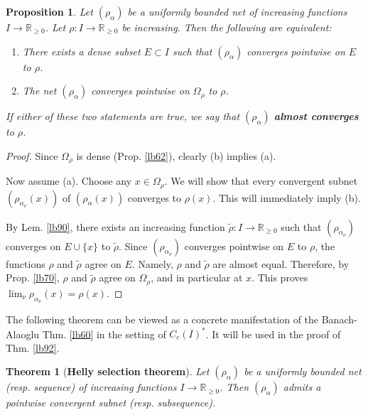 \documentclass[12pt,b5paper,notitlepage]{article}
\theoremstyle{definition}
\theoremstyle{plain}
\newtheorem{thm}[df]{Theorem}
\newtheorem{pp}[df]{Proposition}
\newcommand{\wtd}{\widetilde}
\newcommand{\Rbb}{\mathbb R}
\numberwithin{equation}{section}
\begin{document}
\begin{pp}\label{lb91}
Let $(\rho_\alpha)$ be a uniformly bounded net of increasing functions $I\rightarrow\Rbb_{\geq0}$. Let $\rho:I\rightarrow\Rbb_{\geq0}$ be increasing. Then the following are equivalent:
\begin{enumerate}[label=(\alph*)]
\item There exists a dense subset $E\subset I$ such that $(\rho_\alpha)$ converges pointwise on $E$ to $\rho$.
\item The net $(\rho_\alpha)$ converges pointwise on $\Omega_\rho$ to $\rho$.
\end{enumerate}
If either of these two statements are true, we say that $(\rho_\alpha)$ \textbf{almost converges} to $\rho$. 
\end{pp}


\begin{proof}
Since $\Omega_\rho$ is dense (Prop. \ref{lb62}), clearly (b) implies (a).

Now assume (a). Choose any $x\in\Omega_\rho$. We will show that every convergent subnet $(\rho_{\alpha_\nu}(x))$ of $(\rho_\alpha(x))$ converges to $\rho(x)$. This will immediately imply (b).

By Lem. \ref{lb90},  there exists an increasing function $\wtd\rho:I\rightarrow\Rbb_{\geq0}$ such that $(\rho_{\alpha_\nu})$ converges on $E\cup\{x\}$ to $\wtd\rho$. Since $(\rho_{\alpha_\nu})$ converges pointwise on $E$ to $\rho$, the functions $\rho$ and $\wtd\rho$ agree on $E$. Namely, $\rho$ and $\wtd\rho$ are almost equal. Therefore, by Prop. \ref{lb70}, $\rho$ and $\wtd\rho$ agree on $\Omega_\rho$, and in particular at $x$. This proves $\lim_\nu\rho_{\alpha_\nu}(x)=\rho(x)$.
\end{proof}


The following theorem can be viewed as a concrete manifestation of the Banach-Alaoglu Thm. \ref{lb60} in the setting of $C_c(I)^*$. It will be used in the proof of Thm. \ref{lb92}.


\begin{thm}[\textbf{Helly selection theorem}]\label{lb94}
Let $(\rho_\alpha)$ be a uniformly bounded net (resp. sequence) of increasing functions $I\rightarrow\Rbb_{\geq0}$. Then $(\rho_\alpha)$ admits a pointwise convergent subnet (resp. subsequence).
\end{thm}
\end{document}
